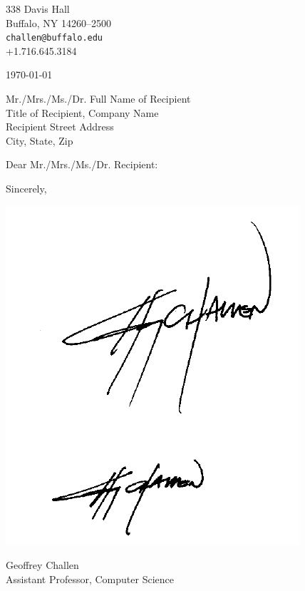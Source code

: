 

\def\shorttitle{}
\def\shortauthors{Geoffrey Challen}


\pagestyle{letter}

338 Davis Hall\\
Buffalo, NY 14260--2500\\
\texttt{challen@buffalo.edu}\\
+1.716.645.3184

\vspace*{0.1in}

\today

\vspace*{0.1in}

\thispagestyle{emptyletter}
Mr./Mrs./Ms./Dr. Full Name of Recipient\\
Title of Recipient, Company Name\\
Recipient Street Address\\
City, State, Zip

\vspace*{0.1in}

Dear Mr./Mrs./Ms./Dr. Recipient:


\vspace*{0.1in}

Sincerely,


\vspace*{-0.1in}
\includegraphics{./figs/LargeSig.pdf}
\vspace*{-0.1in}


Geoffrey Challen\\
Assistant Professor, Computer Science


